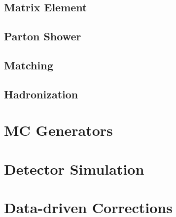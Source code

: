 \subsection{Matrix Element}

\subsection{Parton Shower}

\subsection{Matching}

\subsection{Hadronization}

\section{MC Generators}

\section{Detector Simulation}

\section{Data-driven Corrections}
